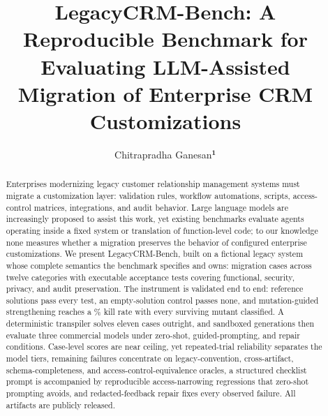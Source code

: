 \documentclass{ieeetj}
\def\authorrefmark#1{\ensuremath{^{\textbf{#1}}}}
\begin{document}


\title{LegacyCRM-Bench: A Reproducible Benchmark for Evaluating LLM-Assisted Migration of
Enterprise CRM Customizations}

\author{Chitrapradha Ganesan\authorrefmark{1}}

\begin{abstract}
Enterprises modernizing legacy customer relationship management systems must migrate a
customization layer: validation rules, workflow automations, scripts, access-control
matrices, integrations, and audit behavior. Large language models are increasingly proposed
to assist this work, yet existing benchmarks evaluate agents operating inside a fixed system
or translation of function-level code; to our knowledge none measures whether a migration
preserves the behavior of configured enterprise customizations. We present LegacyCRM-Bench,
built on a fictional legacy system whose complete semantics the benchmark specifies and
owns: \NumCases{} migration cases across twelve categories with \NumTests{} executable
acceptance tests covering functional, security, privacy, and audit preservation. The
instrument is validated end to end: reference solutions pass every test, an empty-solution
control passes none, and mutation-guided strengthening reaches a \KillRate\% kill rate with
every surviving mutant classified. A deterministic transpiler solves eleven cases outright,
and \PTwoGens{} sandboxed generations then evaluate three commercial models under
zero-shot, guided-prompting, and repair conditions. Case-level scores are near ceiling, yet repeated-trial
reliability separates the model tiers, remaining failures concentrate on
legacy-convention, cross-artifact, schema-completeness, and access-control-equivalence
oracles, a structured
checklist prompt is accompanied by reproducible access-narrowing regressions that zero-shot
prompting avoids, and redacted-feedback repair fixes every observed failure. All
artifacts are publicly released.
\end{abstract}
\end{document}
